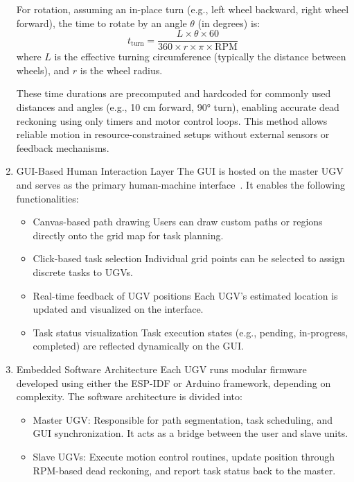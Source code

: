 \documentclass[conference]{IEEEtran}
\begin{document}
\begin{enumerate}
For rotation, assuming an in-place turn (e.g., left wheel backward, right wheel forward), the time to rotate by an angle $\theta$ (in degrees) is:
\begin{equation}
t_{\text{turn}} = \frac{L \times \theta \times 60}{360 \times r \times \pi \times \text{RPM}}
\end{equation}
where $L$ is the effective turning circumference (typically the distance between wheels), and $r$ is the wheel radius.

These time durations are precomputed and hardcoded for commonly used distances and angles (e.g., 10 cm forward, 90° turn), enabling accurate dead reckoning using only timers and motor control loops. This method allows reliable motion in resource-constrained setups without external sensors or feedback mechanisms.

\item{GUI-Based Human Interaction Layer}
\label{subsec:3.6}
The GUI is hosted on the master UGV and serves as the primary human-machine interface~\cite{randomnerd2024esp32}. It enables the following functionalities:
\begin{itemize}
    \item Canvas-based path drawing Users can draw custom paths or regions directly onto the grid map for task planning.
    \item Click-based task selection Individual grid points can be selected to assign discrete tasks to UGVs.
    \item Real-time feedback of UGV positions Each UGV's estimated location is updated and visualized on the interface.
    \item Task status visualization Task execution states (e.g., pending, in-progress, completed) are reflected dynamically on the GUI.
\end{itemize}


\item{Embedded Software Architecture}
Each UGV runs modular firmware developed using either the ESP-IDF or Arduino framework, depending on complexity. The software architecture is divided into:
\begin{itemize}
    \item {Master UGV:} Responsible for path segmentation, task scheduling, and GUI synchronization. It acts as a bridge between the user and slave units.
    \item {Slave UGVs:} Execute motion control routines, update position through RPM-based dead reckoning, and report task status back to the master.
\end{itemize}


\end{enumerate}
\end{document}
